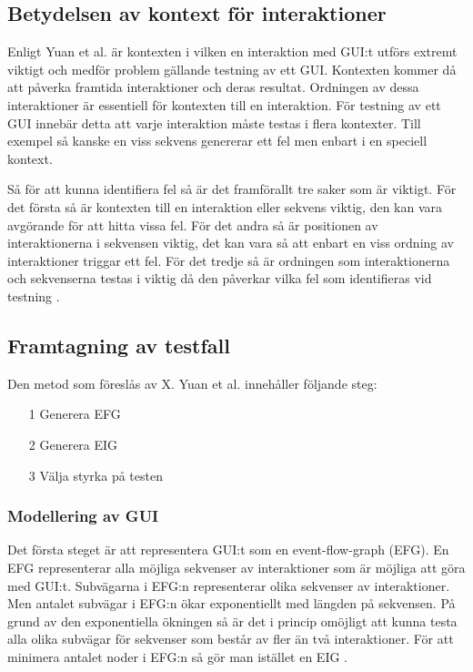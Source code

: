 \subsection{Betydelsen av kontext för interaktioner}

Enligt Yuan et al. \cite{yuan2011gui} är kontexten i vilken en interaktion med GUI:t utförs extremt viktigt och medför problem gällande testning av ett GUI. Kontexten kommer då att påverka framtida interaktioner och deras resultat. Ordningen av dessa interaktioner är essentiell för kontexten till en interaktion. För testning av ett GUI innebär detta att varje interaktion måste testas i flera kontexter. Till exempel så kanske en viss sekvens genererar ett fel men enbart i en speciell kontext.

Så för att kunna identifiera fel så är det framförallt tre saker som är viktigt. För det första så är kontexten till en interaktion eller sekvens viktig, den kan vara avgörande för att hitta vissa fel. För det andra så är positionen av interaktionerna i sekvensen viktig, det kan vara så att enbart en viss ordning av interaktioner triggar ett fel. För det tredje så är ordningen som interaktionerna och sekvenserna testas i viktig då den påverkar vilka fel som identifieras vid testning \cite{yuan2011gui}.

\subsection{Framtagning av testfall}

Den metod som föreslås av X. Yuan et al. \cite{yuan2011gui} innehåller följande steg:

\begin{itemize}
	\item [1] Generera EFG
	\item [2] Generera EIG
	\item [3] Välja styrka på testen
\end{itemize}

\subsubsection{Modellering av GUI}

Det första steget är att representera GUI:t som en event-flow-graph (EFG). En EFG representerar alla möjliga sekvenser av interaktioner som är möjliga att göra med GUI:t. Subvägarna i EFG:n representerar olika sekvenser av interaktioner. Men antalet subvägar i EFG:n ökar exponentiellt med längden på sekvensen. På grund av den exponentiella ökningen så är det i princip omöjligt att kunna testa alla olika subvägar för sekvenser som består av fler än två interaktioner. För att minimera antalet noder i EFG:n så gör man istället en EIG \cite{yuan2011gui}. 

